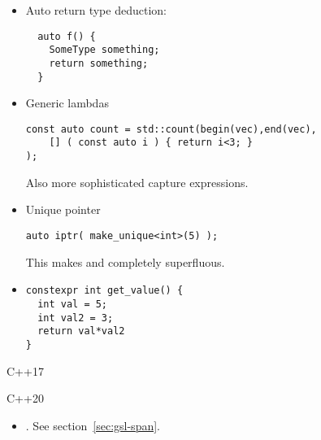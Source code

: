 \begin{itemize}
\item
  Auto return type deduction:
\begin{lstlisting}
  auto f() {
    SomeType something;
    return something;
  }
\end{lstlisting}

\item Generic lambdas
\begin{lstlisting}
const auto count = std::count(begin(vec),end(vec),
    [] ( const auto i ) { return i<3; }    
);
\end{lstlisting}
Also more sophisticated capture expressions.

\item Unique pointer
\begin{lstlisting}
auto iptr( make_unique<int>(5) );    
\end{lstlisting}
This makes  and  completely superfluous.

\item {}
\begin{lstlisting}
constexpr int get_value() {
  int val = 5;
  int val2 = 3;
  return val*val2
}
\end{lstlisting}
\end{itemize}


 {C++17}


 {C++20}

\begin{itemize}
\item {}. See section~\ref{sec:gsl-span}.
\end{itemize}
